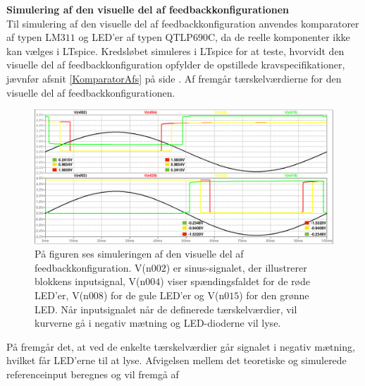 \noindent\textbf{Simulering af den visuelle del af feedbackkonfigurationen} \\
Til simulering af den visuelle del af feedbackkonfiguration anvendes komparatorer af typen LM$311$ og LED'er af typen QTLP$690$C, da de reelle komponenter ikke kan vælges i LTspice. Kredsløbet simuleres i LTspice for at teste, hvorvidt den visuelle del af feedbackkonfiguration opfylder de opstillede kravspecifikationer, jævnfør afsnit \ref{KomparatorAfs} på side \pageref{KomparatorAfs}. Af  fremgår tærskelværdierne for den visuelle del af feedbackkonfigurationen. 

\begin{figure}[H]
	\centering
	\includegraphics[scale=0.36]{figures/cProblemloesning/komparator_visuel_simulering_samlet1.PNG}
	\caption{På figuren ses simuleringen af den visuelle del af feedbackkonfiguration. V(n$002$) er sinus-signalet, der illustrerer blokkens inputsignal, V(n$004$) viser spændingsfaldet for de røde LED'er, V(n$008$) for de gule LED'er og V(n$015$) for den grønne LED. Når inputsignalet når de definerede tærskelværdier, vil kurverne gå i negativ mætning og LED-dioderne vil lyse.}
	\label{fig:komparator_visuel_simulering_samlet1}
\end{figure}

\noindent På  fremgår det, at ved de enkelte tærskelværdier går signalet i negativ mætning, hvilket får LED'erne til at lyse. Afvigelsen mellem det teoretiske og simulerede referenceinput beregnes og vil fremgå af 

